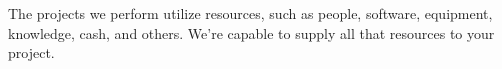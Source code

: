 
The projects we perform utilize resources, such as people, software,
equipment, knowledge, cash, and others. We're capable to supply
all that resources to your project.
